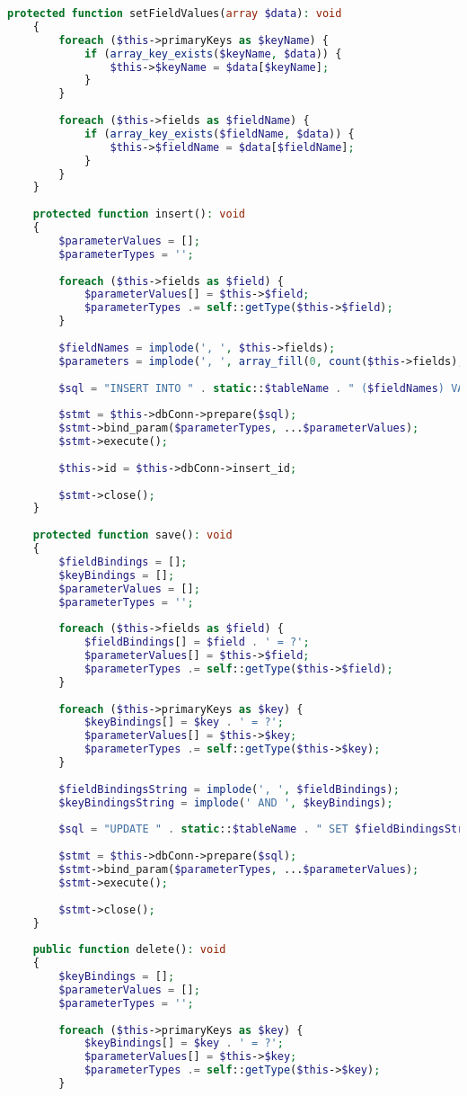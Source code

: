 \begin{lstlisting}[language=PHP, frame=none]
	protected function setFieldValues(array $data): void
	{
		foreach ($this->primaryKeys as $keyName) {
			if (array_key_exists($keyName, $data)) {
				$this->$keyName = $data[$keyName];
			}
		}
		
		foreach ($this->fields as $fieldName) {
			if (array_key_exists($fieldName, $data)) {
				$this->$fieldName = $data[$fieldName];
			}
		}
	}
	
	protected function insert(): void
	{
		$parameterValues = [];
		$parameterTypes = '';
		
		foreach ($this->fields as $field) {
			$parameterValues[] = $this->$field;
			$parameterTypes .= self::getType($this->$field);
		}
		
		$fieldNames = implode(', ', $this->fields);
		$parameters = implode(', ', array_fill(0, count($this->fields), '?'));
		
		$sql = "INSERT INTO " . static::$tableName . " ($fieldNames) VALUES ($parameters)";
		
		$stmt = $this->dbConn->prepare($sql);
		$stmt->bind_param($parameterTypes, ...$parameterValues);
		$stmt->execute();
		
		$this->id = $this->dbConn->insert_id;
		
		$stmt->close();
	}
	
	protected function save(): void
	{
		$fieldBindings = [];
		$keyBindings = [];
		$parameterValues = [];
		$parameterTypes = '';
		
		foreach ($this->fields as $field) {
			$fieldBindings[] = $field . ' = ?';
			$parameterValues[] = $this->$field;
			$parameterTypes .= self::getType($this->$field);
		}
		
		foreach ($this->primaryKeys as $key) {
			$keyBindings[] = $key . ' = ?';
			$parameterValues[] = $this->$key;
			$parameterTypes .= self::getType($this->$key);
		}
		
		$fieldBindingsString = implode(', ', $fieldBindings);
		$keyBindingsString = implode(' AND ', $keyBindings);
		
		$sql = "UPDATE " . static::$tableName . " SET $fieldBindingsString WHERE $keyBindingsString";
		
		$stmt = $this->dbConn->prepare($sql);
		$stmt->bind_param($parameterTypes, ...$parameterValues);
		$stmt->execute();
		
		$stmt->close();
	}
	
	public function delete(): void
	{
		$keyBindings = [];
		$parameterValues = [];
		$parameterTypes = '';
		
		foreach ($this->primaryKeys as $key) {
			$keyBindings[] = $key . ' = ?';
			$parameterValues[] = $this->$key;
			$parameterTypes .= self::getType($this->$key);
		}
		

\end{lstlisting}
